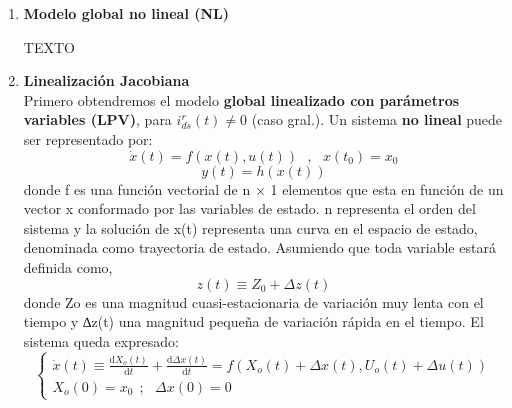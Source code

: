 \documentclass[10pt]{article}
\begin{document}
\begin{enumerate}
    \renewcommand{\theenumi}{\alph{enumi}} %
    \item \textbf{Modelo global no lineal (NL)}
    
    TEXTO

    \item \textbf{Linealización Jacobiana}
    \vspace{0.3cm} 
    \\Primero obtendremos el modelo \textbf{global linealizado con parámetros variables (LPV)}, para $ i_{ds}^{r}\left( t \right ) \neq 0 $ (caso gral.). 
    Un sistema \textbf{no lineal} puede ser representado por:
    \begin{equation}
        \dot{x}\left ( t \right )= f\left ( x\left ( t \right ),u\left ( t \right ) \right ) \ \ \ ,\ \ \ x\left ( t_{0} \right )=x_{0}
    \end{equation}
    \begin{equation}
        y\left ( t \right )=h\left ( x\left ( t \right ) \right )
    \end{equation}
    donde f es una función vectorial de n × 1 elementos que esta en función de un vector x conformado por las variables de estado.
    n representa el orden del sistema y la solución de x(t) representa una curva en el espacio de estado, denominada como trayectoria de estado.
    Asumiendo que toda variable estará definida como,
    \begin{equation}
        z\left ( t \right )\equiv Z_{0} + \Delta z\left ( t \right )
    \end{equation}
    donde Zo es una magnitud cuasi-estacionaria de variación muy lenta con el tiempo y ∆z(t) una magnitud pequeña de variación rápida en el tiempo.
    El sistema queda expresado:
    \begin{equation}
        \begin{cases}
            \dot{x}\left ( t \right )\equiv
            \frac{\mathrm{d} X_{o}\left ( t \right )}{\mathrm{d} t}+
            \frac{\mathrm{d} \Delta x\left ( t \right )}{\mathrm{d} t}
            =
            f\left ( X_{o}\left ( t \right )+\Delta x\left ( t \right ),U_{o}\left ( t \right )+\Delta u\left ( t \right ) \right )
            \\
            X_{o}\left ( 0 \right )=x_{0}\ \ ;\ \ \ \Delta x\left ( 0 \right )=0
        \end{cases}
    \end{equation}


\end{enumerate}
\end{document}
